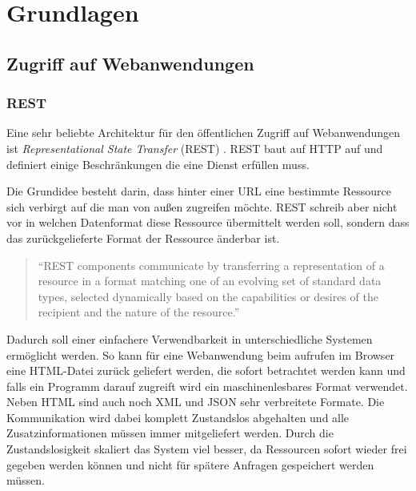 

\chapter{Grundlagen} %
\label{cha:grundlagen}

\section{Zugriff auf Webanwendungen} %
\label{sec:zugriff_auf_webanwendungen}

\subsection{REST} %
\label{sub:rest}

Eine sehr beliebte Architektur für den öffentlichen Zugriff auf Webanwendungen ist \emph{Representational State Transfer} (REST) \cite[S.\,76]{fielding2000architectural}. REST baut auf HTTP auf und definiert einige Beschränkungen die eine Dienst erfüllen muss. 

\medskip

Die Grundidee besteht darin, dass hinter einer URL eine bestimmte Ressource sich verbirgt auf die man von außen zugreifen möchte. REST schreib aber nicht vor in welchen Datenformat diese Ressource übermittelt werden soll, sondern dass das zurückgelieferte Format der Ressource änderbar ist. 


\begin{quote}
\enquote{REST components communicate by transferring a representation of a resource
in a format matching one of an evolving set of standard data types, selected dynamically
based on the capabilities or desires of the recipient and the nature of the resource.}\cite[S.\,87]{fielding2000architectural} 

\end{quote}

Dadurch soll einer einfachere Verwendbarkeit in unterschiedliche Systemen ermöglicht werden. So kann für eine Webanwendung beim aufrufen im Browser eine HTML-Datei zurück geliefert werden, die sofort betrachtet werden kann und falls ein Programm darauf zugreift wird ein maschinenlesbares Format verwendet. Neben HTML sind auch noch XML und JSON sehr verbreitete Formate. Die Kommunikation wird dabei komplett Zustandslos abgehalten und alle Zusatzinformationen müssen immer mitgeliefert werden. Durch die Zustandslosigkeit skaliert das System viel besser, da Ressourcen sofort wieder frei gegeben werden können und nicht für spätere Anfragen gespeichert werden müssen. 

